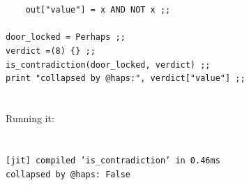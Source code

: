 \begin{exbox}
{  \textup{\texttt{~~~~out["value"] = x AND NOT x ;;}} \\
  \  \\
  \textup{\texttt{door\_locked = Perhaps ;;}} \\
  \textup{\texttt{verdict =(8) \{\} ;;}} \\
  \textup{\texttt{is\_contradiction(door\_locked, verdict) ;;}} \\
  \textup{\texttt{print "collapsed by @haps:", verdict["value"] ;;}} \\
  \textasciigrave{}\textasciigrave{}\textasciigrave{} \\
  \  \\
  Running it: \\
  \  \\
  \textasciigrave{}\textasciigrave{}\textasciigrave{} \\
  \textup{\texttt{[jit] compiled 'is\_contradiction' in 0.46ms}} \\
  \textup{\texttt{collapsed by @haps: False}} \\
  \textasciigrave{}\textasciigrave{}\textasciigrave{}}
\end{exbox}
